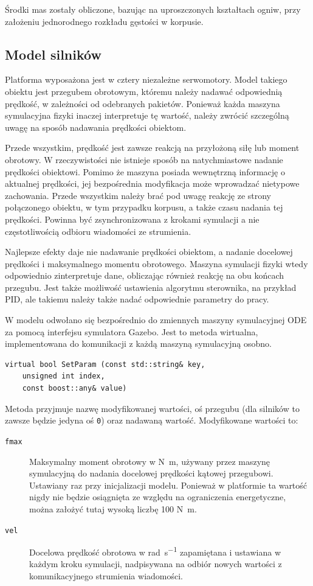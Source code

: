 		Środki mas zostały obliczone, bazując na uproszczonych kształtach ogniw, przy założeniu jednorodnego rozkładu gęstości w korpusie.
		
	\subsection{Model silników}
		Platforma wyposażona jest w cztery niezależne serwomotory. 
		Model takiego obiektu jest przegubem obrotowym, któremu należy nadawać odpowiednią prędkość, w zależności od odebranych pakietów.
		Ponieważ każda maszyna symulacyjna fizyki inaczej interpretuje tę wartość, należy zwrócić szczególną uwagę na sposób nadawania prędkości obiektom.
		
		Przede wszystkim, prędkość jest zawsze reakcją na przyłożoną siłę lub moment obrotowy. W rzeczywistości nie istnieje sposób na natychmiastowe nadanie prędkości obiektowi.
		Pomimo że maszyna posiada wewnętrzną informację o aktualnej prędkości,
		jej bezpośrednia modyfikacja może wprowadzać nietypowe zachowania. Przede wszystkim należy brać pod uwagę reakcję ze strony połączonego obiektu, w tym przypadku korpusu,
		a także czasu nadania tej prędkości. Powinna być zsynchronizowana z krokami symulacji a nie częstotliwością odbioru wiadomości ze strumienia.
		
		Najlepsze efekty daje nie nadawanie prędkości obiektom, a nadanie docelowej prędkości i maksymalnego momentu obrotowego.
		Maszyna symulacji fizyki wtedy odpowiednio zinterpretuje dane, obliczając również reakcję na obu końcach przegubu.
		Jest także możliwość ustawienia algorytmu sterownika, na przykład PID, ale takiemu należy także nadać odpowiednie parametry do pracy.
		
		W modelu odwołano się bezpośrednio do zmiennych maszyny symulacyjnej ODE za pomocą interfejsu symulatora Gazebo.
		Jest to metoda wirtualna, implementowana do komunikacji z każdą maszyną symulacyjną osobno.
		\begin{verbatim}
virtual bool SetParam (const std::string& key,
	unsigned int index,
	const boost::any& value)
		\end{verbatim}
		Metoda przyjmuje nazwę modyfikowanej wartości, oś przegubu (dla silników to zawsze będzie jedyna oś \texttt{0}) oraz nadawaną wartość.
		Modyfikowane wartości to:
		\begin{description}
			\item[\texttt{fmax}] Maksymalny moment obrotowy w \si{\newton\metre}, używany przez maszynę symulacyjną do nadania docelowej prędkości kątowej przegubowi. Ustawiany raz przy inicjalizacji modelu. Ponieważ w platformie ta wartość nigdy nie będzie osiągnięta ze względu na ograniczenia energetyczne, można założyć tutaj wysoką liczbę 100 \si{\newton\metre}.
			\item[\texttt{vel}] Docelowa prędkość obrotowa w \si{\radian\per\second} zapamiętana i ustawiana w każdym kroku symulacji, nadpisywana na odbiór nowych wartości z komunikacyjnego strumienia wiadomości.
		\end{description}
	

